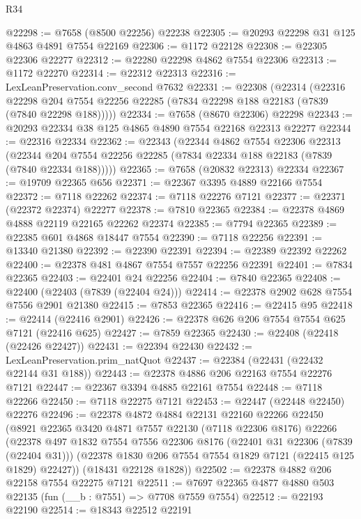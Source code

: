 \begin{lexlean}{R34}
\begin{coremodule}
@22298 := @7658 (@8500 @22256) @22238
@22305 := @20293 @22298 @31 @125 @4863 @4891 @7554 @22169
@22306 := @1172 @22128
@22308 := @22305 @22306 @22277
@22312 := @22280 @22298 @4862 @7554 @22306
@22313 := @1172 @22270
@22314 := @22312 @22313
@22316 := LexLeanPreservation.conv_second @7632
@22331 := @22308
    (@22314
      (@22316
        @22298
        @204
        @7554
        @22256
        @22285
        (@7834 @22298 @188 @22183 (@7839 (@7840 @22298 @188)))))
@22334 := @7658 (@8670 @22306) @22298
@22343 := @20293 @22334 @38 @125 @4865 @4890 @7554 @22168 @22313 @22277
@22344 := @22316 @22334
@22362 := @22343
    (@22344
      @4862
      @7554
      @22306
      @22313
      (@22344 @204 @7554 @22256 @22285 (@7834 @22334 @188 @22183 (@7839 (@7840 @22334 @188)))))
@22365 := @7658 (@20832 @22313) @22334
@22367 := @19709 @22365 @656
@22371 := @22367 @3395 @4889 @22166 @7554
@22372 := @7118 @22262
@22374 := @7118 @22276 @7121
@22377 := @22371 (@22372 @22374) @22277
@22378 := @7810 @22365
@22384 := @22378 @4869 @4888 @22119 @22165 @22262 @22374
@22385 := @7794 @22365
@22389 := @22385 @601 @4868 @18447 @7554
@22390 := @7118 @22256
@22391 := @13340 @21380
@22392 := @22390 @22391
@22394 := @22389 @22392 @22262
@22400 := @22378 @481 @4867 @7554 @7557 @22256 @22391
@22401 := @7834 @22365
@22403 := @22401 @24 @22256
@22404 := @7840 @22365
@22408 := @22400 (@22403 (@7839 (@22404 @24)))
@22414 := @22378 @2902 @628 @7554 @7556 @2901 @21380
@22415 := @7853 @22365
@22416 := @22415 @95
@22418 := @22414 (@22416 @2901)
@22426 := @22378 @626 @206 @7554 @7554 @625 @7121 (@22416 @625)
@22427 := @7859 @22365
@22430 := @22408 (@22418 (@22426 @22427))
@22431 := @22394 @22430
@22432 := LexLeanPreservation.prim_natQuot
@22437 := @22384 (@22431 (@22432 @22144 @31 @188))
@22443 := @22378 @4886 @206 @22163 @7554 @22276 @7121
@22447 := @22367 @3394 @4885 @22161 @7554
@22448 := @7118 @22266
@22450 := @7118 @22275 @7121
@22453 := @22447 (@22448 @22450) @22276
@22496 := @22378
    @4872
    @4884
    @22131
    @22160
    @22266
    @22450
    (@8921
      @22365
      @3420
      @4871
      @7557
      @22130
      (@7118 @22306 @8176)
      @22266
      (@22378
        @497
        @1832
        @7554
        @7556
        @22306
        @8176
        (@22401 @31 @22306 (@7839 (@22404 @31)))
        (@22378 @1830 @206 @7554 @7554 @1829 @7121 (@22415 @125 @1829) @22427))
      (@18431 @22128 @1828))
@22502 := @22378 @4882 @206 @22158 @7554 @22275 @7121
@22511 := @7697 @22365 @4877 @4880 @503 @22135 (fun (__b : @7551) => @7708 @7559 @7554)
@22512 := @22193 @22190
@22514 := @18343 @22512 @22191

\end{coremodule}
\end{lexlean}
